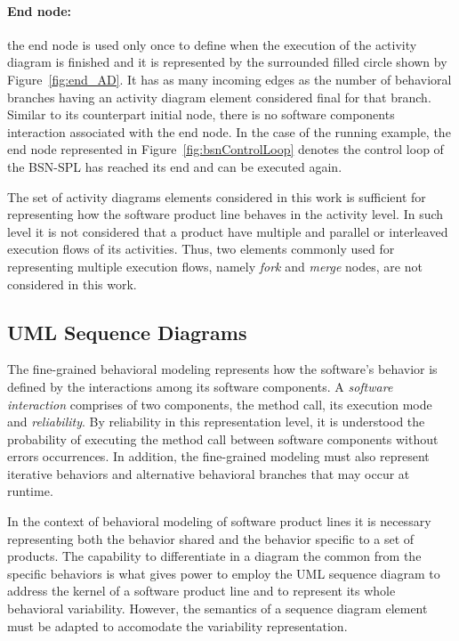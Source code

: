 \paragraph{End node: \label{par:endNodeModeling}} 
the end node is used only once to define when the execution of the activity
diagram is finished and it is represented by the surrounded filled circle shown
by Figure~\ref{fig:end_AD}. It has as many incoming edges as the number of
behavioral branches having an activity diagram element considered final for that
branch. Similar to its counterpart initial node, there is no software components
interaction associated with the end node. In the case of the running example,
the end node represented in Figure~\ref{fig:bsnControlLoop} denotes the control
loop of the BSN-SPL has reached its end and can be executed again.

The set of activity diagrams elements considered in this work is sufficient for
representing how the software product line behaves in the activity level. In
such level it is not considered that a product have multiple and parallel or
interleaved execution flows of its activities. Thus, two elements commonly used
for representing multiple execution flows, namely \emph{fork} and \emph{merge}
nodes, are not considered in this work. 





\subsection{UML Sequence Diagrams \label{subsec:umlSequenceDiagrams}}

The fine-grained behavioral modeling represents how the software's behavior is
defined by the interactions among its software components. A \emph{software
interaction} comprises of two components, the method call, its execution mode and
\emph{reliability}. By reliability in this representation level, it is understood the probability of executing the
method call between software components without errors occurrences. In addition, the fine-grained modeling
must also represent iterative behaviors and alternative behavioral branches that
may occur at runtime. 

In the context of behavioral modeling of software product lines it is
necessary representing both the behavior shared and the behavior specific  to a set of products. The capability to
differentiate in a diagram the common from the specific behaviors is what gives
power to employ the UML sequence diagram to address the kernel of a software
product line and to represent its whole behavioral variability. However, the
semantics of a sequence diagram element must be adapted to accomodate the
variability representation. 

